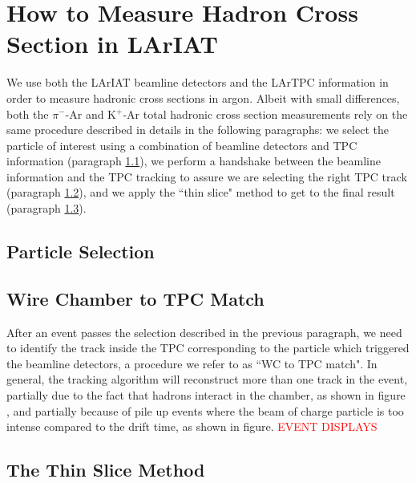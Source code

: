 \section{How to Measure Hadron Cross Section in LArIAT}\label{ch:methodology}
We use both the LArIAT  beamline detectors and the LArTPC information in order to measure hadronic cross sections in argon. Albeit with small differences, both the  $\pi^{-}$-Ar and K$^{+}$-Ar total hadronic cross section measurements rely on the same procedure described in details in the following paragraphs: we select the particle of interest using a combination of beamline detectors and TPC information (paragraph \ref{ch:ParticleSelectionMethod}), we perform a handshake between the beamline information and the TPC tracking to assure we are selecting the right TPC track (paragraph \ref{ch:WC2TPCMatchMethod}), and we apply the ``thin slice" method to get to the final result (paragraph \ref{ch:ThinSliceMethod}).
\subsection{Particle Selection}\label{ch:ParticleSelectionMethod}
\subsection{Wire Chamber to TPC Match}\label{ch:WC2TPCMatchMethod}
After an event passes the selection described in the previous paragraph, we need to identify the track inside the TPC corresponding to the particle which triggered the beamline detectors, a procedure we refer to as ``WC to TPC match". In general, the tracking algorithm will reconstruct more than one track in the event, partially due to the fact that hadrons interact in the chamber, as shown in figure , and partially because of pile up events where the beam of charge particle is too intense compared to the drift time, as shown in figure. 
\textcolor{red}{EVENT DISPLAYS}



\subsection{The Thin Slice Method}\label{ch:ThinSliceMethod}
